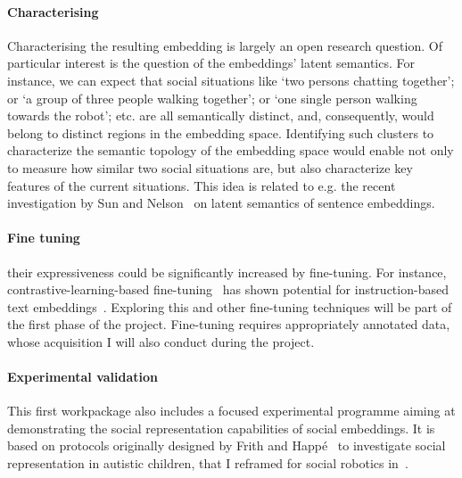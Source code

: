 \paragraph{Characterising} Characterising the resulting embedding is largely an open research question. Of
particular interest is the question of the embeddings' latent semantics. For
instance, we can expect that social situations like `two persons chatting
together'; or `a group of three people walking together'; or `one single person
walking towards the robot'; etc. are all semantically distinct, and,
consequently, would belong to distinct regions in the embedding space.
Identifying such clusters to characterize the semantic topology of the embedding
space would enable not only to measure how similar two social situations are,
but also characterize key features of the current situations.  This idea is
related to e.g. the recent investigation by Sun and
Nelson~\cite{sun2023topological} on latent semantics of sentence embeddings.

\paragraph{Fine tuning} their expressiveness could be significantly increased by
fine-tuning. For instance, contrastive-learning-based
fine-tuning~\cite{hadsell2006dimensionality} has shown potential for
instruction-based text embeddings~\cite{canal2022survey}.  Exploring this and
other fine-tuning techniques will be part of the first phase of the project.
Fine-tuning requires appropriately annotated data, whose acquisition I will also
conduct during the project.

\paragraph{Experimental validation} This first workpackage also includes a
focused experimental programme aiming at demonstrating the social representation
capabilities of social embeddings. It is based on protocols originally designed
by Frith and Happé~\cite{frith1994autism} to investigate social representation
in autistic children, that I reframed for social robotics
in~\cite{lemaignan2015mutual}.


%


